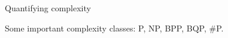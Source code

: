 \documentclass[10pt]{beamer}
\begin{document}
\begin{frame}{Quantifying complexity} %



Some important complexity classes: P, NP, BPP, BQP, \#P. %






\end{frame}
\end{document}

